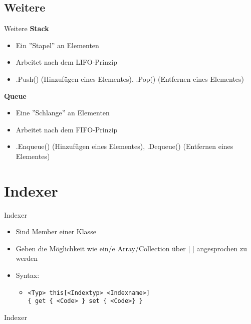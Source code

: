 \subsection{Weitere}
\begin{frame}{Weitere}
	\textbf{Stack}\\
	\begin{itemize}
		\item Ein ''Stapel'' an Elementen
		\item Arbeitet nach dem LIFO-Prinzip
		\item \alert{.Push()} (Hinzufügen eines Elementes), \alert{.Pop()} (Entfernen eines Elementes)
	\end{itemize}
	
	\textbf{Queue}\\
	\begin{itemize}
		\item Eine ''Schlange'' an Elementen
		\item Arbeitet nach dem FIFO-Prinzip
		\item \alert{.Enqueue()} (Hinzufügen eines Elementes), \alert{.Dequeue()} (Entfernen eines Elementes)
	\end{itemize}
	
\end{frame}

\section{Indexer}
\begin{frame}{Indexer}
	\begin{itemize}
		\item Sind Member einer Klasse
		\item Geben die Möglichkeit wie ein/e Array/Collection über \alert{[ ]} angesprochen zu werden
		\item Syntax:
		\begin{itemize}
			\item \texttt{\alert{<Typ>} this[\alert{<Indextyp> <Indexname>}]\\ \{ get \{ \alert{<Code>} \} set \{ \alert{<Code>}\} \}}
		\end{itemize}
	\end{itemize}
\end{frame}

\begin{frame}{Indexer}
	
\end{frame}


